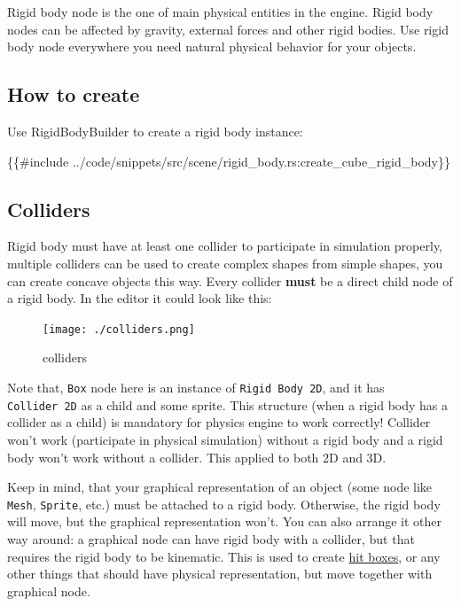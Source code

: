 \documentclass[
]{book}
\newenvironment{Shaded}{\begin{snugshade}}{\end{snugshade}}
\newcommand{\NormalTok}[1]{#1}
\theoremstyle{definition}
\theoremstyle{definition}
\theoremstyle{definition}
\theoremstyle{definition}
\theoremstyle{remark}
\begin{document}
Rigid body node is the one of main physical entities in the engine. Rigid body nodes can be affected by gravity, external forces and other rigid bodies. Use rigid body node everywhere you need natural physical behavior for your objects.

\subsection{How to create}\label{how-to-create-9}

Use RigidBodyBuilder to create a rigid body instance:

\begin{Shaded}
\begin{Highlighting}[]
\NormalTok{\{\{\#include ../code/snippets/src/scene/rigid\_body.rs:create\_cube\_rigid\_body\}\}}
\end{Highlighting}
\end{Shaded}

\subsection{Colliders}\label{colliders}

Rigid body must have at least one collider to participate in simulation properly, multiple colliders can be used to create complex shapes from simple shapes, you can create concave objects this way. Every collider \textbf{must} be a direct child node of a rigid body. In the editor it could look like this:

\begin{figure}
\centering
\texttt{[image: ./colliders.png]}
\caption{colliders}
\end{figure}

Note that, \texttt{Box} node here is an instance of \texttt{Rigid\ Body\ 2D}, and it has \texttt{Collider\ 2D} as a child and some sprite. This structure (when a rigid body has a collider as a child) is mandatory for physics engine to work correctly! Collider won't work (participate in physical simulation) without a rigid body and a rigid body won't work without a collider. This applied to both 2D and 3D.

Keep in mind, that your graphical representation of an object (some node like \texttt{Mesh}, \texttt{Sprite}, etc.) must be attached to a rigid body. Otherwise, the rigid body will move, but the graphical representation won't. You can also arrange it other way around: a graphical node can have rigid body with a collider, but that requires the rigid body to be kinematic. This is used to create \href{./collider.md\#using-colliders-for-hit-boxes}{hit boxes}, or any other things that should have physical representation, but move together with graphical node.
\end{document}

